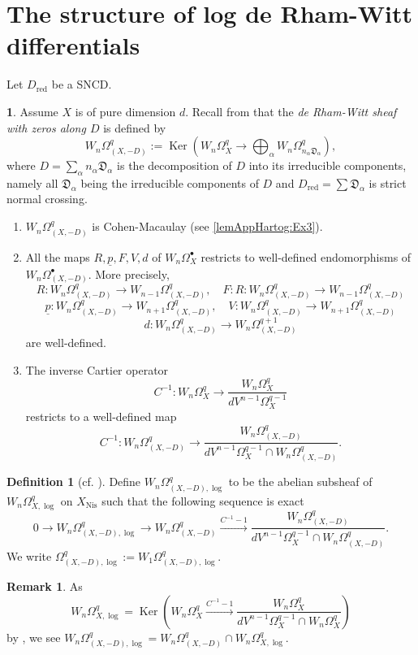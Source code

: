 \documentclass[11pt]{amsart}
\newcommand{\ra}{\rightarrow}
\newcommand{\sD}{\mathfrak{D}}
\newcommand{\Ker}{\operatorname{Ker}}
\newcommand{\xra}{\xrightarrow}
\newcommand{\red}{{\operatorname{red}}}
\newcommand{\Nis}{{\operatorname{Nis}}}
\newcommand{\ul}{\underline}
\theoremstyle{plain}
\theoremstyle{definition}
\newtheorem{defn}[prop]{Definition}
\newtheorem{para}[prop]{}
\newtheorem{remark}[prop]{Remark}
\numberwithin{equation}{prop}
\begin{document}
\section{The structure of log de Rham-Witt differentials}
Let $D_{\red}$ be a SNCD. 

\begin{para}
Assume $X$ is of pure dimension $d$.
Recall from \cite{RamFil1} that the \textit{de Rham-Witt sheaf with zeros along $D$} is defined by
$$W_n\Omega^q_{(X,-D)}:=\Ker\left(W_n\Omega^q_X\ra\bigoplus_\alpha W_n\Omega^q_{n_{\alpha} \sD_\alpha}\right),
$$
where $D=\sum_\alpha n_{\alpha} \sD_\alpha$ is the decomposition of $D$ into its irreducible components, namely all $\sD_{\alpha}$
being the irreducible components of $D$ and $D_{\red}=\sum \sD_\alpha$ is strict normal crossing.

\begin{enumerate}[label=(\arabic*)]
\item 
$W_n\Omega^q_{(X,-D)}$ is Cohen-Macaulay (see \eqref{lemAppHartog:Ex3}).
\item 
All the maps $R,\ul p,F,V,d$ of $W_n\Omega^\bullet_X$ restricts to well-defined endomorphisms of $W_n\Omega^\bullet_{(X,-D)}$. 
More precisely, 
$$R: W_n\Omega^q_{(X,-D)}\ra W_{n-1}\Omega^q_{(X,-D)},\quad
F:R: W_n\Omega^q_{(X,-D)}\ra W_{n-1}\Omega^q_{(X,-D)}$$
$$\ul p: W_n\Omega^q_{(X,-D)}\ra W_{n+1}\Omega^q_{(X,-D)},\quad
V:W_n\Omega^q_{(X,-D)}\ra W_{n+1}\Omega^q_{(X,-D)}$$
$$d: W_n\Omega^q_{(X,-D)}\ra  W_n\Omega^{q+1}_{(X,-D)}$$
are well-defined.
\item 
The inverse Cartier operator 
$$C^{-1}: W_n\Omega^q_{X} \ra
\frac{W_n\Omega^q_{X}}{dV^{n-1}\Omega^{q-1}_X}$$
restricts to a well-defined map
$$C^{-1}:W_n\Omega^q_{(X,-D)}\ra 
\frac{W_n\Omega^q_{(X,-D)}}{dV^{n-1}\Omega^{q-1}_X\cap W_n\Omega^q_{(X,-D)}}.$$

\end{enumerate}


\end{para}



\begin{defn}[{cf. \cite[Lemma 11.6]{RamFil1}}]
Define $W_n\Omega^q_{(X,-D),\log}$ to be the abelian subsheaf of $W_n\Omega^q_{X,\log}$ on $X_\Nis$ such that the following sequence is exact
$$0\ra
W_n\Omega^q_{(X,-D),\log}\ra
W_n\Omega^q_{(X,-D)}\xra{C^{-1}-1}
\frac{W_n\Omega^q_{(X,-D)}}{dV^{n-1}\Omega^{q-1}_X\cap W_n\Omega^q_{(X,-D)}}.$$
We write $\Omega^q_{(X,-D),\log}:=W_1\Omega^q_{(X,-D),\log}$.
\end{defn}
\begin{remark}
As 
$$W_n\Omega^q_{X,\log}=
\Ker\left( W_n\Omega^q_{X}\xra{C^{-1}-1}
\frac{W_n\Omega^q_{X}}{dV^{n-1}\Omega^{q-1}_X\cap W_n\Omega^q_{X}}
\right)$$
by \cite[Lemma 4.1.5]{Kato-dualityI},
we see
$W_n\Omega^q_{(X,-D),\log}=W_n\Omega^q_{(X,-D)}\cap W_n\Omega^q_{X,\log}$.
\end{remark}
\end{document}
